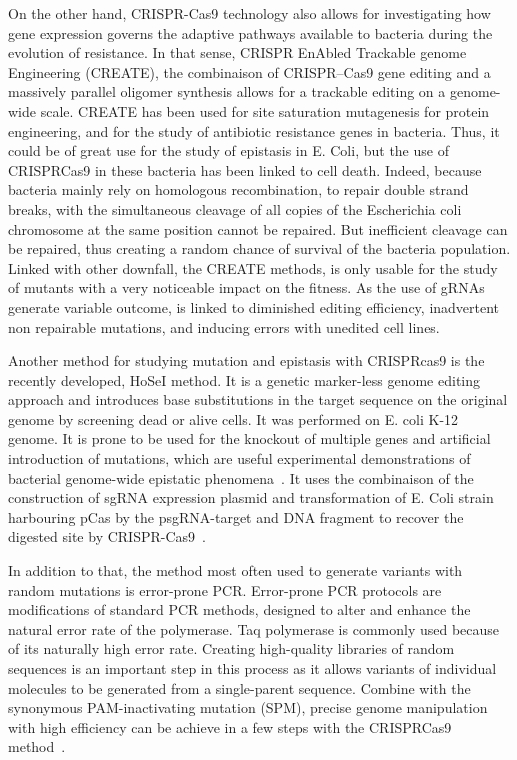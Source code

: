 \documentclass[12pt]{article}
\begin{document}
  On the other hand, CRISPR-Cas9 technology also allows for investigating how
  gene expression governs the adaptive pathways available to bacteria during
  the evolution of resistance. In that sense, CRISPR EnAbled Trackable genome
  Engineering (CREATE), the combinaison of CRISPR–Cas9 gene editing and a
  massively parallel oligomer synthesis allows for a trackable editing on a
  genome-wide scale. CREATE has been used for site saturation mutagenesis for
  protein engineering, and for the study of antibiotic resistance genes in
  bacteria. Thus, it could be of great use for the study of epistasis in E.
  Coli, but the use of CRISPRCas9 in these bacteria has been linked to cell
  death. Indeed, because bacteria mainly rely on homologous recombination, to
  repair double strand breaks, with the simultaneous cleavage of all copies of
  the Escherichia coli chromosome at the same position cannot be repaired. But
  inefficient cleavage can be repaired, thus creating a random chance of
  survival of the bacteria population. Linked with other downfall, the CREATE
  methods, is only usable for the study of mutants with a very noticeable
  impact on the fitness. As the use of gRNAs generate variable outcome, is
  linked to diminished editing efficiency, inadvertent non repairable
  mutations, and inducing errors with unedited cell lines. 

  Another method for studying mutation and epistasis with CRISPRcas9 is the
  recently developed, HoSeI method. It is a genetic marker-less genome editing
  approach and introduces base substitutions in the target sequence on the
  original genome by screening dead or alive cells. It was performed on E. coli
  K-12 genome. It is prone to be used for the knockout of multiple genes and
  artificial introduction of mutations, which are useful experimental
  demonstrations of bacterial genome-wide epistatic
  phenomena~\cite{miyake2020epistatic}. It uses the combinaison of the
  construction of sgRNA expression plasmid and transformation of E. Coli strain
  harbouring pCas by the psgRNA-target and DNA fragment to recover the digested
  site by CRISPR-Cas9~\cite{xie2014genome}.

  In addition to that, the method most often used to generate variants with
  random mutations is error-prone PCR\@. Error-prone PCR protocols are
  modifications of standard PCR methods, designed to alter and enhance the
  natural error rate of the polymerase. Taq polymerase is commonly used because
  of its naturally high error rate. Creating high-quality libraries of random
  sequences is an important step in this process as it allows variants of
  individual molecules to be generated from a single-parent sequence. Combine
  with the synonymous PAM-inactivating mutation (SPM), precise genome
  manipulation with high efficiency can be achieve in a few steps with the
  CRISPRCas9 method~\cite{arnold2003directed}. 
\end{document}
